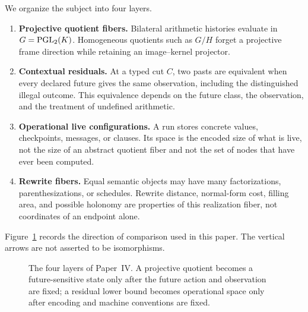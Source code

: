 We organize the subject into four layers.
\begin{enumerate}
  \item \textbf{Projective quotient fibers.}
  Bilateral arithmetic histories evaluate in $G=\operatorname{PGL}_2(K)$.  Homogeneous
  quotients such as $G/H$ forget a projective frame direction while retaining
  an image--kernel projector.

  \item \textbf{Contextual residuals.}
  At a typed cut $C$, two pasts are equivalent when every declared future
  gives the same observation, including the distinguished illegal outcome.  This equivalence depends on the future
  class, the observation, and the treatment of undefined arithmetic.

  \item \textbf{Operational live configurations.}
  A run stores concrete values, checkpoints, messages, or clauses.  Its space
  is the encoded size of what is live, not the size of an abstract quotient
  fiber and not the set of nodes that have ever been computed.

  \item \textbf{Rewrite fibers.}
  Equal semantic objects may have many factorizations, parenthesizations, or
  schedules.  Rewrite distance, normal-form cost, filling area, and possible
  holonomy are properties of this realization fiber, not coordinates of an
  endpoint alone.
\end{enumerate}

Figure~\ref{fig:intro-four-layers} records the direction of comparison used in
this paper.  The vertical arrows are not asserted to be isomorphisms.

\begin{figure}[ht]
\centering
{}
\caption{The four layers of Paper~IV.  A projective quotient becomes a
future-sensitive state only after the future action and observation are fixed;
a residual lower bound becomes operational space only after encoding and
machine conventions are fixed.}
\label{fig:intro-four-layers}
\end{figure}

